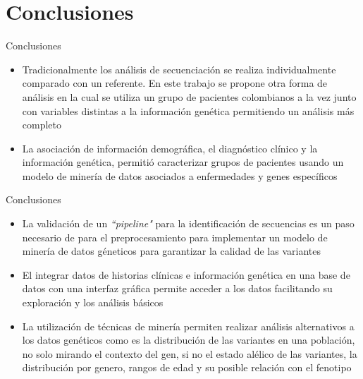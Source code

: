 \documentclass[xcolor=dvipsnames]{beamer}
\begin{document}
\section{Conclusiones}

\begin{frame}{Conclusiones}

    \begin{itemize}
    \justifying
     
     \item  Tradicionalmente los análisis de secuenciación se realiza individualmente comparado con un referente. En este trabajo se propone otra forma de análisis en la cual se utiliza un grupo de pacientes colombianos a la vez junto con variables distintas a la información genética permitiendo un análisis más completo
    
    \item La asociación de información demográfica, el diagnóstico clínico y la información genética, permitió caracterizar grupos de pacientes usando un modelo de minería de datos asociados a enfermedades y genes específicos  \end{itemize}
  
\end{frame}

\begin{frame}{Conclusiones}
\begin{itemize}
    \justifying
    
    \item La validación de un \textit{``pipeline"} para la identificación de secuencias es un paso necesario de para el preprocesamiento para implementar un modelo de minería de datos géneticos para garantizar la calidad de las variantes
    
    \item El integrar datos de historias clínicas e información genética en una base de datos con una interfaz gráfica permite acceder a los datos facilitando su exploración y los análisis básicos
     
    \item La utilización de técnicas de minería permiten realizar análisis alternativos a los datos genéticos como es la distribución de las variantes en una población, no solo mirando el contexto del gen, si no el estado alélico de las variantes, la distribución por genero, rangos de edad y su posible relación con el fenotipo   
 
\end{itemize}    
    
\end{frame}
\end{document}
